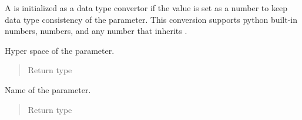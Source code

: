 \documentclass[letterpaper,10pt,english]{sphinxmanual}
\begin{document}
\begin{fulllineitems}
A  is initialized as a data type convertor if the
value is set as a number to keep data type consistency of the parameter.
This conversion supports python built-in numbers,  numbers, and
any number that inherits .

%
\begin{sphinxVerbatim}[commandchars=\\\{\}]
   
  
\end{sphinxVerbatim}

\begin{fulllineitems}
\label{\detokenize{matchzoo.engine:matchzoo.engine.param.Param.hyper_space}}
 \textendash{} Hyper space of the parameter.
\begin{quote}\begin{description}
\item[{Return type}] \leavevmode
{}

\end{description}\end{quote}

\end{fulllineitems}


\begin{fulllineitems}
\label{\detokenize{matchzoo.engine:matchzoo.engine.param.Param.name}}
 \textendash{} Name of the parameter.
\begin{quote}\begin{description}
\item[{Return type}] \leavevmode
{}


\end{description}
\end{quote}
\end{fulllineitems}
\end{fulllineitems}
\end{document}
